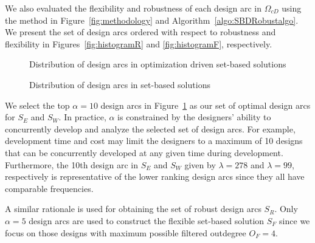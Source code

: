 We also evaluated the flexibility and robustness of each design arc in $\Omega_{cD}$ using the method in Figure~\ref{fig:methodology} and Algorithm~\ref{algo:SBDRobustalgo}. We present the set of design arcs ordered with respect to robustness and flexibility in Figures~\ref{fig:histogramR} and \ref{fig:histogramF}, respectively.

\begin{figure}[h!]
	\centering
	 \hspace{0.1\textwidth}%
	 \hspace{0.1\textwidth}%
	\caption{Distribution of design arcs in optimization driven set-based solutions}
	\label{fig:histogramplotsSBD}
\end{figure}

\begin{figure}[h!]
	\centering
	 \hspace{0.1\textwidth}%
	 \hspace{0.1\textwidth}%
	\caption{Distribution of design arcs in set-based solutions}
	\label{fig:histogramplots}
\end{figure}

We select the top $\alpha = 10$ design arcs in Figure~\ref{fig:histogramplotsSBD} as our set of optimal design arcs for $S_E$ and $S_W$. In practice, $\alpha$ is constrained by the designers' ability to concurrently develop and analyze the selected set of design arcs. For example, development time and cost may limit the designers to a maximum of 10 designs that can be concurrently developed at any given time during development. Furthermore, the 10th design arc in $S_E$ and $S_W$ given by $\lambda = 278$ and $\lambda = 99$, respectively is representative of the lower ranking design arcs since they all have comparable frequencies. 

A similar rationale is used for obtaining the set of robust design arcs $S_R$. Only $\alpha=5$ design arcs are used to construct the flexible set-based solution $S_F$ since we focus on those designs with maximum possible filtered outdegree $O_F = 4$.

